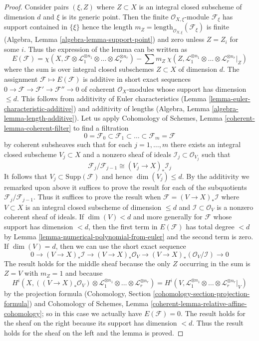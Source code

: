 \documentclass[10pt,a4paper]{amsart}
\theoremstyle{plain}
\theoremstyle{definition}
\theoremstyle{remark}
\numberwithin{equation}{subsection}
\begin{document}
\begin{proof}
Consider pairs $(\xi , Z)$ where $Z \subset X$ is an integral
closed subscheme of dimension $d$ and $\xi$ is its generic point.
Then the finite $\mathcal{O}_{X, \xi}$-module $\mathcal{F}_\xi$
has support contained in $\{\xi\}$ hence the length
$m_Z = \text{length}_{\mathcal{O}_{X, \xi}}(\mathcal{F}_\xi)$
is finite (Algebra, Lemma \ref{algebra-lemma-support-point})
and zero unless $Z = Z_i$ for some $i$. Thus the expression
of the lemma can be written as
$$
E(\mathcal{F}) =
\chi(X, \mathcal{F} \otimes \mathcal{L}_1^{\otimes n_1} \otimes \ldots \otimes
\mathcal{L}_r^{\otimes n_r}) -
\sum\nolimits
m_Z\ \chi(Z, \mathcal{L}_1^{\otimes n_1} \otimes \ldots \otimes
\mathcal{L}_r^{\otimes n_r}|_Z)
$$
where the sum is over integral closed subschemes $Z \subset X$
of dimension $d$. The assignment $\mathcal{F} \mapsto E(\mathcal{F})$
is additive in short exact sequences
$0 \to \mathcal{F} \to \mathcal{F}' \to \mathcal{F}'' \to 0$
of coherent $\mathcal{O}_X$-modules whose support has dimension
$\leq d$. This follows from additivity of Euler characteristics
(Lemma \ref{lemma-euler-characteristic-additive})
and additivity of lengths
(Algebra, Lemma \ref{algebra-lemma-length-additive}).
Let us apply Cohomology of Schemes, Lemma \ref{coherent-lemma-coherent-filter}
to find a filtration
$$
0 = \mathcal{F}_0 \subset \mathcal{F}_1 \subset
\ldots \subset \mathcal{F}_m = \mathcal{F}
$$
by coherent subsheaves such that for each $j = 1, \ldots, m$
there exists an integral closed subscheme $V_j \subset X$
and a nonzero sheaf of ideals $\mathcal{I}_j \subset \mathcal{O}_{V_j}$
such that
$$
\mathcal{F}_j/\mathcal{F}_{j - 1}
\cong (V_j \to X)_* \mathcal{I}_j
$$
It follows that $V_j \subset \text{Supp}(\mathcal{F})$ and
hence $\dim(V_j) \leq d$.
By the additivity we remarked upon above it suffices to
prove the result for each of the subquotients
$\mathcal{F}_j/\mathcal{F}_{j - 1}$. Thus it suffices to prove
the result when $\mathcal{F} = (V \to X)_*\mathcal{I}$ where
$V \subset X$ is an integral closed subscheme of dimension $\leq d$
and $\mathcal{I} \subset \mathcal{O}_V$ is a nonzero coherent
sheaf of ideals. If $\dim(V) < d$ and more generally for $\mathcal{F}$
whose support has dimension $< d$, then the first term
in $E(\mathcal{F})$ has total degree $< d$ by
Lemma \ref{lemma-numerical-polynomial-from-euler}
and the second term is zero. If $\dim(V) = d$, then we can use the
short exact sequence
$$
0 \to (V \to X)_*\mathcal{I} \to (V \to X)_*\mathcal{O}_V
\to (V \to X)_*(\mathcal{O}_V/\mathcal{I}) \to 0
$$
The result holds for the middle sheaf because
the only $Z$ occurring in the sum is $Z = V$
with $m_Z = 1$ and because
$$
H^i(X, ((V \to X)_*\mathcal{O}_V) \otimes 
 \mathcal{L}_1^{\otimes n_1} \otimes \ldots \otimes
\mathcal{L}_r^{\otimes n_r}) =
H^i(V,  \mathcal{L}_1^{\otimes n_1} \otimes \ldots \otimes
\mathcal{L}_r^{\otimes n_r}|_V)
$$
by the projection formula
(Cohomology, Section \ref{cohomology-section-projection-formula}) and
Cohomology of Schemes, Lemma
\ref{coherent-lemma-relative-affine-cohomology};
so in this case we actually have $E(\mathcal{F}) = 0$.
The result holds for the sheaf on the right because its support
has dimension $< d$. Thus the result holds for the sheaf on the
left and the lemma is proved.
\end{proof}
\end{document}
